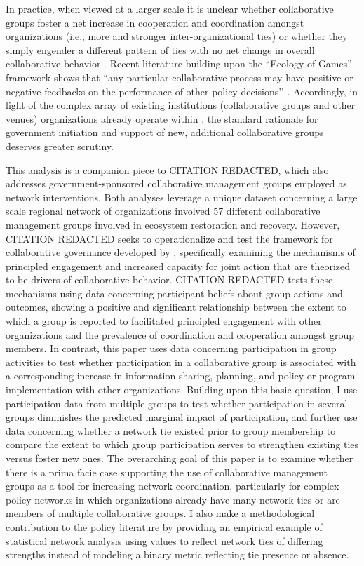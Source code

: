 \documentclass[12pt,a4paper,titlepage]{article}
\begin{document}
In practice, when viewed at a larger scale it is unclear whether collaborative groups foster a net increase in cooperation and coordination amongst organizations (i.e., more and stronger inter-organizational ties) or whether they simply engender a different pattern of ties with no net change in overall collaborative behavior \parencite{lubell2010,lubell2011}. Recent literature building upon the ``Ecology of Games'' framework \parencite{berardo2010,lubell2010,lubell2011, lubell2011-a, mcallister2014, smaldino2014, niles2012} shows that “any particular collaborative process may have positive or negative feedbacks on the performance of other policy decisions’’ \parencite[424]{gerlak2012}. Accordingly, in light of the complex array of existing institutions (collaborative groups and other venues) organizations already operate within \parencite[see][]{lubell2013, lubell2011-a}, the standard rationale for government initiation and support of new, additional collaborative groups deserves greater scrutiny.

This analysis is a companion piece to CITATION REDACTED, which also addresses government-sponsored collaborative management groups employed as network interventions. Both analyses leverage a unique dataset concerning a large scale regional network of organizations involved 57 different collaborative management groups involved in ecosystem restoration and recovery. However, CITATION REDACTED seeks to operationalize and test the framework for collaborative governance developed by \textcite{emerson2012}, specifically examining the mechanisms of principled engagement and increased capacity for joint action that are theorized to be drivers of collaborative behavior. CITATION REDACTED tests these mechanisms using data concerning participant beliefs about group actions and outcomes, showing a positive and significant relationship between the extent to which a group is reported to facilitated principled engagement with other organizations and the prevalence of coordination and cooperation amongst group members. In contrast, this paper uses data concerning participation in group activities to test whether participation in a collaborative group is associated with a corresponding increase in information sharing, planning, and policy or program implementation with other organizations. Building upon this basic question, I use participation data from multiple groups to test whether participation in several groups diminishes the predicted marginal impact of participation, and further use data concerning whether a network tie existed prior to group membership to compare the extent to which group participation serves to strengthen existing ties versus foster new ones. The overarching goal of this paper is to examine whether there is a prima facie case supporting the use of collaborative management groups as a tool for increasing network coordination, particularly for complex policy networks in which organizations already have many network ties or are members of multiple collaborative groups. I also make a methodological contribution to the policy literature by providing an empirical example of statistical network analysis using values to reflect network ties of differing strengths instead of modeling a binary metric reflecting tie presence or absence. 
\end{document}
